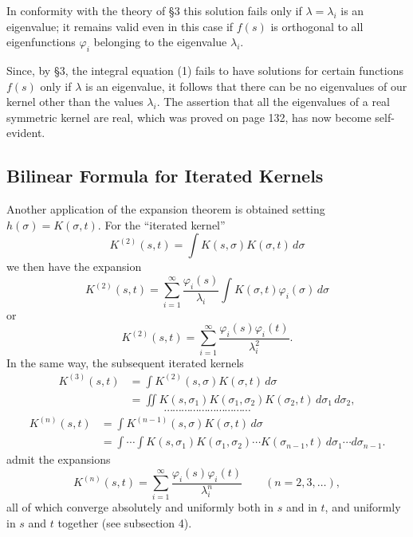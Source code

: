 In conformity with the theory of \S3 this solution fails only if $\lambda=\lambda_i$ is an eigenvalue; it remains valid even in this case if $f(s)$ is orthogonal to all eigenfunctions $\varphi_i$ belonging to the eigenvalue $\lambda_i$.

Since, by \S3, the integral equation (1) fails to have solutions for certain functions $f(s)$ only if $\lambda$ is an eigenvalue, it follows that there can be no eigenvalues of our kernel other than the values $\lambda_i$. The assertion that all the eigenvalues of a real symmetric kernel are real, which was proved on page 132, has now become self-evident.

\subsection{Bilinear Formula for Iterated Kernels}
Another application of the expansion theorem is obtained setting $h(\sigma)=K(\sigma,t)$. For the ``iterated kernel''
\[
K^{(2)}(s,t)=\int K(s,\sigma)K(\sigma,t)\,d\sigma
\]
we then have the expansion
\[
K^{(2)}(s,t)=\sum_{i=1}^{\infty}\frac{\varphi_i(s)}{\lambda_i}
\int K(\sigma,t)\varphi_i(\sigma)\,d\sigma
\]
or
\begin{equation}\tag{57}
K^{(2)}(s,t)=\sum_{i=1}^{\infty}\frac{\varphi_i(s)\varphi_i(t)}{\lambda_i^2}.
\end{equation}
In the same way, the subsequent iterated kernels
\[
\begin{aligned}
K^{(3)}(s,t)
&=\int K^{(2)}(s,\sigma)K(\sigma,t)\,d\sigma\\
&=\iint K(s,\sigma_1)K(\sigma_1,\sigma_2)K(\sigma_2,t)\,d\sigma_1\,d\sigma_2,
\end{aligned}
\]
\[
\cdots\cdots\cdots\cdots\cdots\cdots\cdots\cdots\cdots\cdots
\]
\[
\begin{aligned}
K^{(n)}(s,t)
&=\int K^{(n-1)}(s,\sigma)K(\sigma,t)\,d\sigma\\
&=\int\cdots\int K(s,\sigma_1)K(\sigma_1,\sigma_2)\cdots K(\sigma_{n-1},t)\,
 d\sigma_1\cdots d\sigma_{n-1}.
\end{aligned}
\]
admit the expansions
\begin{equation}\tag{58}
K^{(n)}(s,t)=\sum_{i=1}^{\infty}\frac{\varphi_i(s)\varphi_i(t)}{\lambda_i^n}
\qquad(n=2,3,\ldots),
\end{equation}
all of which converge absolutely and uniformly both in $s$ and in $t$, and uniformly in $s$ and $t$ together (see subsection 4).

